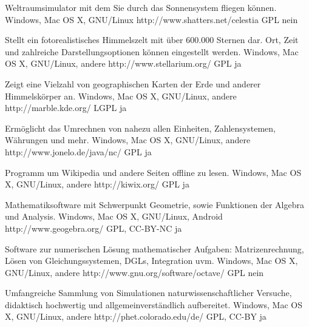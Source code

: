 \documentclass[11pt,a4paper,landscape,twocolumn]{article}
\begin{document}


{Weltraumsimulator mit dem Sie durch das Sonnensystem fliegen können.}
{Windows, Mac OS X, GNU/Linux}
{http://www.shatters.net/celestia}
{GPL}
{nein}

{Stellt ein fotorealistisches Himmelszelt mit über 600.000 Sternen dar. Ort, Zeit und zahlreiche Darstellungsoptionen können eingestellt werden.}
{Windows, Mac OS X, GNU/Linux, andere}
{http://www.stellarium.org/}
{GPL}
{ja}

{Zeigt eine Vielzahl von geographischen Karten der Erde und anderer Himmelskörper an.}
{Windows, Mac OS X, GNU/Linux, andere}
{http://marble.kde.org/}
{LGPL}
{ja}

{Ermöglicht das Umrechnen von nahezu allen Einheiten, Zahlensystemen, Währungen und mehr.}
{Windows, Mac OS X, GNU/Linux, andere}
{http://www.jonelo.de/java/nc/}
{GPL}
{ja}

\newpage %

{Programm um Wikipedia und andere Seiten offline zu lesen.}
{Windows, Mac OS X, GNU/Linux, andere}
{http://kiwix.org/}
{GPL}
{ja}

{Mathematiksoftware mit Schwerpunkt Geometrie, sowie Funktionen der Algebra und Analysis.}
{Windows, Mac OS X, GNU/Linux, Android}
{http://www.geogebra.org/}
{GPL, CC-BY-NC}
{ja}

{Software zur numerischen Lösung mathematischer Aufgaben: Matrizenrechnung, Lösen von Gleichungssystemen, DGLs, Integration uvm.}
{Windows, Mac OS X, GNU/Linux, andere}
{http://www.gnu.org/software/octave/}
{GPL}
{nein}

{Umfangreiche Sammlung von Simulationen naturwissenschaftlicher Versuche, didaktisch hochwertig und allgemeinverständlich aufbereitet.}
{Windows, Mac OS X, GNU/Linux, andere}
{http://phet.colorado.edu/de/}
{GPL, CC-BY}
{ja}
\end{document}
